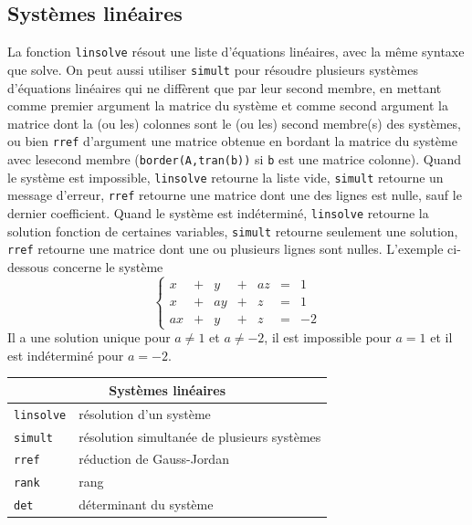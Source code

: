 \documentclass{article}
\begin{document}
\begin{giacjshere}
\subsection{Syst\`emes lin\'eaires}
%
La fonction \verb|linsolve| r\'esout une liste d'\'equations
lin\'eaires, avec la m\^eme syntaxe que solve. On peut aussi utiliser
\verb|simult|  pour r\'esoudre plusieurs syst\`emes d'\'equations lin\'eaires 
qui ne diff\`erent que par leur second membre, en mettant comme premier 
argument la matrice du syst\`eme et comme second argument la matrice dont la 
(ou les) colonnes sont le (ou les) second membre(s) des syst\`emes, ou bien 
\verb|rref| d'argument une matrice obtenue en bordant la matrice du syst\`eme 
avec lesecond membre ({\tt border(A,tran(b))} si {\tt b} est une matrice 
colonne). Quand le syst\`eme est impossible, \verb|linsolve| retourne
la liste vide, \verb|simult| retourne un message d'erreur, \verb|rref|
retourne une matrice dont une des lignes est nulle, sauf le dernier
coefficient. Quand le syst\`eme est ind\'etermin\'e, \verb|linsolve|
retourne la solution fonction de certaines variables,  \verb|simult|
retourne seulement une solution, \verb|rref| retourne une matrice dont
une ou plusieurs lignes sont nulles. L'exemple ci-dessous concerne
le syst\`eme
$$
\left\{ \begin{array}{llllllr}
 x &+& y &+& az&=&1\\
 x & +& a y&+& z&=&1 \\
 ax & +&y &+& z&=&-2 
\end{array}\right.
$$
Il a une solution unique pour $a\neq 1$ et  $a\neq -2$, il est impossible pour
$a=1$ et il est ind\'etermin\'e pour $a=-2$.



\begin{center}
\begin{tabular}{|ll|}
\hline
\multicolumn{2}{|c|}{\bf Syst\`emes lin\'eaires}\\
\hline\hline
\verb|linsolve| & r\'esolution d'un syst\`eme\\
\verb|simult| & r\'esolution simultan\'ee de plusieurs syst\`emes\\
\verb|rref| & r\'eduction de Gauss-Jordan\\
\verb|rank| &rang\\
\verb|det| & d\'eterminant du syst\`eme\\
\hline
\end{tabular}
\end{center}
%

\end{giacjshere}
\end{document}
